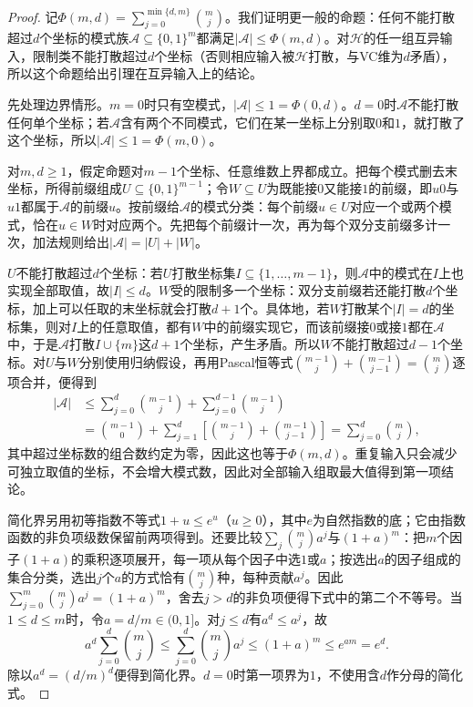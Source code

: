 \begin{proof}
记$\Phi(m,d)=\sum_{j=0}^{\min\{d,m\}}\binom mj$。我们证明更一般的命题：任何不能打散超过$d$个坐标的模式族$\mathcal A\subseteq\{0,1\}^m$都满足$|\mathcal A|\leq\Phi(m,d)$。对$\mathcal H$的任一组互异输入，限制类不能打散超过$d$个坐标（否则相应输入被$\mathcal H$打散，与VC维为$d$矛盾），所以这个命题给出引理在互异输入上的结论。

先处理边界情形。$m=0$时只有空模式，$|\mathcal A|\leq1=\Phi(0,d)$。$d=0$时$\mathcal A$不能打散任何单个坐标；若$\mathcal A$含有两个不同模式，它们在某一坐标上分别取$0$和$1$，就打散了这个坐标，所以$|\mathcal A|\leq1=\Phi(m,0)$。

对$m,d\geq1$，假定命题对$m-1$个坐标、任意维数上界都成立。把每个模式删去末坐标，所得前缀组成$U\subseteq\{0,1\}^{m-1}$；令$W\subseteq U$为既能接$0$又能接$1$的前缀，即$u0$与$u1$都属于$\mathcal A$的前缀$u$。按前缀给$\mathcal A$的模式分类：每个前缀$u\in U$对应一个或两个模式，恰在$u\in W$时对应两个。先把每个前缀计一次，再为每个双分支前缀多计一次，加法规则给出$|\mathcal A|=|U|+|W|$。

$U$不能打散超过$d$个坐标：若$U$打散坐标集$I\subseteq\{1,\ldots,m-1\}$，则$\mathcal A$中的模式在$I$上也实现全部取值，故$|I|\leq d$。$W$受的限制多一个坐标：双分支前缀若还能打散$d$个坐标，加上可以任取的末坐标就会打散$d+1$个。具体地，若$W$打散某个$|I|=d$的坐标集，则对$I$上的任意取值，都有$W$中的前缀实现它，而该前缀接$0$或接$1$都在$\mathcal A$中，于是$\mathcal A$打散$I\cup\{m\}$这$d+1$个坐标，产生矛盾。所以$W$不能打散超过$d-1$个坐标。对$U$与$W$分别使用归纳假设，再用Pascal恒等式$\binom{m-1}j+\binom{m-1}{j-1}=\binom mj$逐项合并，便得到
\[
 \begin{aligned}
  |\mathcal A|
  &\leq\sum_{j=0}^{d}\binom{m-1}{j}
       +\sum_{j=0}^{d-1}\binom{m-1}{j}\\
  &=\binom{m-1}0+\sum_{j=1}^{d}\left[\binom{m-1}j+\binom{m-1}{j-1}\right]
  =\sum_{j=0}^{d}\binom mj,
 \end{aligned}
\]
其中超过坐标数的组合数约定为零，因此这也等于$\Phi(m,d)$。重复输入只会减少可独立取值的坐标，不会增大模式数，因此对全部输入组取最大值得到第一项结论。

简化界另用初等指数不等式$1+u\leq e^u$（$u\geq0$），其中$e$为自然指数的底；它由指数函数的非负项级数保留前两项得到。还要比较$\sum_j\binom mja^j$与$(1+a)^m$：把$m$个因子$(1+a)$的乘积逐项展开，每一项从每个因子中选$1$或$a$；按选出$a$的因子组成的集合分类，选出$j$个$a$的方式恰有$\binom mj$种，每种贡献$a^j$。因此$\sum_{j=0}^m\binom mja^j=(1+a)^m$，舍去$j>d$的非负项便得下式中的第二个不等号。当$1\leq d\leq m$时，令$a=d/m\in(0,1]$。对$j\leq d$有$a^d\leq a^j$，故
\[
  a^d\sum_{j=0}^{d}\binom mj
  \leq\sum_{j=0}^{d}\binom mj a^j
  \leq(1+a)^m\leq e^{am}=e^d.
\]
除以$a^d=(d/m)^d$便得到简化界。$d=0$时第一项界为$1$，不使用含$d$作分母的简化式。
\end{proof}

